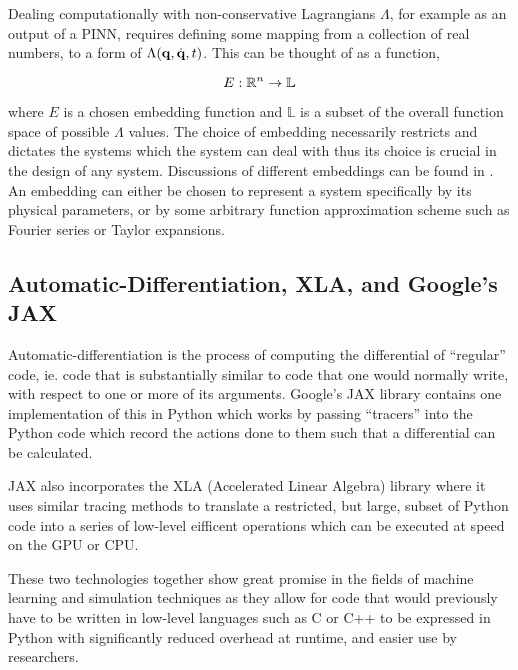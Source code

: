 Dealing computationally with non-conservative Lagrangians $\Lambda$, for example as an output of a PINN, requires defining some mapping from a collection of real 	numbers, to a form of $\Lambda(\vb{q}, \dot{\vb{q}}, t)$. This can be thought of as a function,

\begin{equation}
  E: \mathbb{R}^n \to \mathbb{L}
\end{equation}

where $E$ is a chosen embedding function and $\mathbb{L}$ is a subset of the overall function space of possible $\Lambda$ values. The choice of embedding necessarily restricts and dictates the systems which the system can deal with thus its choice is crucial in the design of any system. Discussions of different embeddings can be found in . An embedding can either be chosen to represent a system specifically by its physical parameters, or by some arbitrary function approximation scheme such as Fourier series or Taylor expansions.

\subsection{Automatic-Differentiation, XLA, and Google's JAX}
\label{sec:intro-autodiff}

Automatic-differentiation is the process of computing the differential of \enquote{regular} code, ie. code that is substantially similar to code that one would normally write, with respect to one or more of its arguments. Google's JAX library \cite{jax2018github} contains one implementation of this in Python which works by passing \enquote{tracers} into the Python code which record the actions done to them such that a differential can be calculated.

JAX also incorporates the XLA (Accelerated Linear Algebra) library \cite{openxla-xla} where it uses similar tracing methods to translate a restricted, but large, subset of Python code into a series of low-level eifficent operations which can be executed at speed on the GPU or CPU.

These two technologies together show great promise in the fields of machine learning and simulation techniques as they allow for code that would previously have to be written in low-level languages such as C or C++ to be expressed in Python with significantly reduced overhead at runtime, and easier use by researchers.
